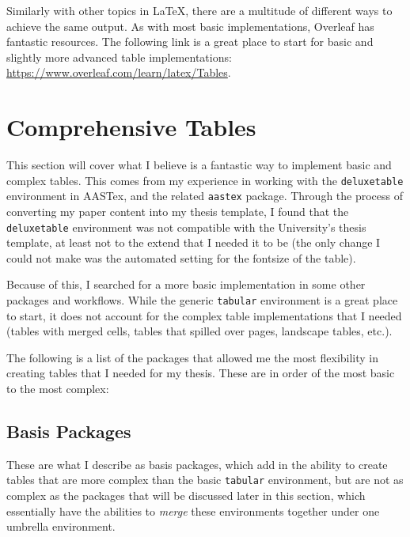 \label{sec: tables}

Similarly with other topics in \LaTeX, there are a multitude of different ways to achieve the same output. As with most basic implementations, Overleaf has fantastic resources. The following link is a great place to start for basic and slightly more advanced table implementations: \url{https://www.overleaf.com/learn/latex/Tables}.

\section{Comprehensive Tables}
\label{sec: tables-comprehensive}

This section will cover what I believe is a fantastic way to implement basic and complex tables. This comes from my experience in working with the \texttt{deluxetable} environment in AASTex, and the related \texttt{aastex} package. Through the process of converting my paper content into my thesis template, I found that the \texttt{deluxetable} environment was not compatible with the University's thesis template, at least not to the extend that I needed it to be (the only change I could not make was the automated setting for the fontsize of the table).

Because of this, I searched for a more basic implementation in some other packages and workflows. While the generic \texttt{tabular} environment is a great place to start, it does not account for the complex table implementations that I needed (tables with merged cells, tables that spilled over pages, landscape tables, etc.).

The following is a list of the packages that allowed me the most flexibility in creating tables that I needed for my thesis. These are in order of the most basic to the most complex:

\subsection{Basis Packages}
\label{sec: tables-basis-packages}

These are what I describe as basis packages, which add in the ability to create tables that are more complex than the basic \texttt{tabular} environment, but are not as complex as the packages that will be discussed later in this section, which essentially have the abilities to \emph{merge} these environments together under one umbrella environment.


